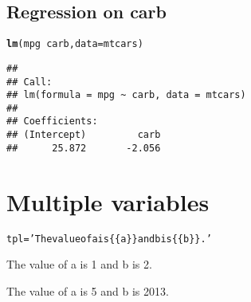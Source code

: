 \documentclass{article}\usepackage[]{graphicx}\usepackage[]{color}
\makeatletter
\newcommand{\hlstr}[1]{\textcolor[rgb]{0.192,0.494,0.8}{#1}}%
\newcommand{\hlopt}[1]{\textcolor[rgb]{0,0,0}{#1}}%
\newcommand{\hlstd}[1]{\textcolor[rgb]{0.345,0.345,0.345}{#1}}%
\newcommand{\hlkwb}[1]{\textcolor[rgb]{0.69,0.353,0.396}{#1}}%
\newcommand{\hlkwc}[1]{\textcolor[rgb]{0.333,0.667,0.333}{#1}}%
\newcommand{\hlkwd}[1]{\textcolor[rgb]{0.737,0.353,0.396}{\textbf{#1}}}%
\newenvironment{kframe}{%
 \def\at@end@of@kframe{}%
 \ifinner\ifhmode%
  \def\at@end@of@kframe{\end{minipage}}%
  \begin{minipage}{\columnwidth}%
 \fi\fi%
 \def\FrameCommand##1{\hskip\@totalleftmargin \hskip-\fboxsep
 \colorbox{shadecolor}{##1}\hskip-\fboxsep
     \hskip-\linewidth \hskip-\@totalleftmargin \hskip\columnwidth}%
 \MakeFramed {\advance\hsize-\width
   \@totalleftmargin\z@ \linewidth\hsize
   \@setminipage}}%
 {\par\unskip\endMakeFramed%
 \at@end@of@kframe}
\newenvironment{knitrout}{}{} %
\makeatother
\begin{document}
\subsection{Regression on carb}
\begin{knitrout}
\color{fgcolor}\begin{kframe}
\begin{alltt}
\hlkwd{lm}\hlstd{(mpg}\hlopt{~}\hlstd{carb,} \hlkwc{data}\hlstd{=mtcars)}
\end{alltt}
\begin{verbatim}
## 
## Call:
## lm(formula = mpg ~ carb, data = mtcars)
## 
## Coefficients:
## (Intercept)         carb  
##      25.872       -2.056
\end{verbatim}
\end{kframe}
\end{knitrout}

\section{Multiple variables}
\begin{knitrout}
\color{fgcolor}\begin{kframe}
\begin{alltt}
\hlstd{tpl} \hlkwb{=} \hlstr{'The value of a is \{\{a\}\} and b is \{\{b\}\}.'}
\end{alltt}
\end{kframe}
\end{knitrout}

The value of a is 1 and b is 2.

The value of a is 5 and b is 2013.
\end{document}
